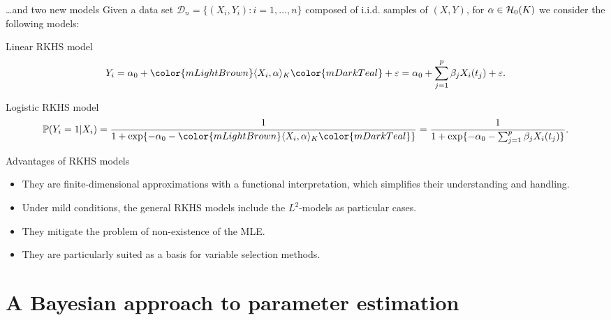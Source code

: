 \documentclass[9pt, english, professionalfonts]{beamer}
\newcommand\maroon[1]{\color{mLightBrown}#1\color{mDarkTeal}}
\newcommand{\D} {\ensuremath{\mathcal{D}}}
\newcommand{\Hcal} {\ensuremath\mathcal{H}}
\begin{document}
\begin{frame}{\ldots and two new models}
  Given a data set \(\D_n = \{(X_i, Y_i): i=1,\dots, n\}\) composed of i.i.d. samples of \((X, Y)\), for \(\alpha \in \Hcal_0(K)\) we consider the following models:

  \vspace{1em}

  \begin{block}{Linear RKHS model}
  \[
    Y_i = \alpha_0 + \maroon{\langle X_i, \alpha \rangle_K} + \varepsilon = \alpha_0 + \sum_{j=1}^p \beta_j X_i(t_j) + \varepsilon.
  \]
\end{block}
\vspace{1em}

\begin{block}{Logistic RKHS model}
    \[
    \mathbb P (Y_i=1| X_i) = \frac{1}{1 + \exp\{-\alpha_0 - \maroon{\langle X_i, \alpha\rangle_K}\}} = \frac{1}{1 + \exp\{-\alpha_0 - \sum_{j=1}^p \beta_j X_i(t_j)\}}.
  \]
\end{block}

\end{frame}

\begin{frame}{Advantages of RKHS models}
  \begin{itemize}
    \item They are finite-dimensional approximations with a functional interpretation, which simplifies their understanding and handling.
    \item Under mild conditions, the general RKHS models include the \(L^2\)-models as particular cases.
    \item They mitigate the problem of non-existence of the MLE.
    \item They are particularly suited as a basis for variable selection methods.
  \end{itemize}
\end{frame}

\section{A Bayesian approach to parameter estimation}
\end{document}
